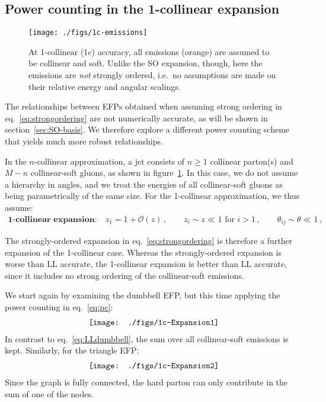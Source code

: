 \documentclass[a4paper,11pt]{article}
\newcommand{\eq}[1]{eq.~\eqref{eq:#1}}
\renewcommand{\sec}[1]{section~\ref{sec:#1}}
\newcommand{\fig}[1]{figure~\ref{fig:#1}}
\begin{document}
\subsection{Power counting in the 1-collinear expansion}

\begin{figure}[t]\centering
 \texttt{[image: ./figs/1c-emissions]} \hfill 
 \caption{At 1-collinear (1c) accuracy, all emissions (orange) are assumed to be collinear and soft.
 Unlike the SO expansion, though, here the emissions are \emph{not} strongly ordered, i.e.\ no assumptions are made on their relative energy and angular scalings. \label{fig:csoft}}
 \end{figure}

The relationships between EFPs obtained when assuming strong ordering in \eq{strongordering} are not numerically accurate, as will be shown in \sec{SO-basis}.
%
We therefore explore a different power counting scheme that yields much more robust relationships.



In the $n$-collinear approximation, a jet consists of $n \geq 1$ collinear parton(s) and $M-n$ collinear-soft gluons, as shown in \fig{csoft}.
%
In this case, we do not assume a hierarchy in angles, and we treat the energies of all collinear-soft gluons as being parametrically of the same size.
%
For the 1-collinear approximation, we thus assume: 
\begin{align} \label{eq:pc}
 \textbf{1-collinear expansion:} \quad z_1 = 1 + \mathcal{O}(z)\,, \qquad z_i \sim z \ll 1 \text{ for } i>1\,, \qquad \theta_{ij} \sim \theta \ll 1\,,
\end{align}


The strongly-ordered expansion in \eq{strongordering} is therefore a further expansion of the 1-collinear case.
%
Whereas the strongly-ordered expansion is worse than LL accurate, the 1-collinear expansion is better than LL accurate, since it includes no strong ordering of the collinear-soft emissions.


We start again by examining the dumbbell EFP, but this time applying the power counting in \eq{pc}:
\begin{align} \label{eq:dumbbell}
 \texttt{[image: ./figs/1c-Expansion1]} \raisetag{2.0\baselineskip}
\end{align}
In contrast to \eq{LLdumbbell}, the sum over all collinear-soft emissions is kept.
Similarly, for the triangle EFP:
\begin{align} \label{eq:triangle}
 \texttt{[image: ./figs/1c-Expansion2]} \raisetag{2.0\baselineskip}    
\end{align}
Since the graph is fully connected, the hard parton can only contribute in the sum of one of the nodes.
\end{document}
